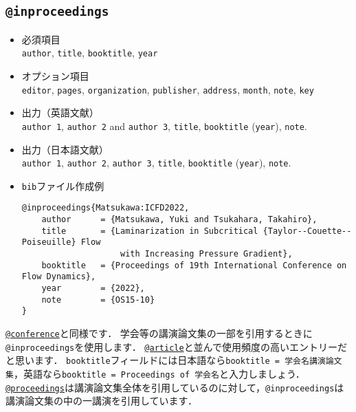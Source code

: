 \documentclass[a4paper,fleqn,uplatex,dvipdfmx]{jsarticle}
\begin{document}
\subsection{\texttt{@inproceedings}}
\label{ssec:inproceedings}
\begin{screen}
    \begin{itemize}
        \item 必須項目 \\
        \verb|author|, \verb|title|, \verb|booktitle|, \verb|year|
        \item オプション項目 \\
        \verb|editor|, \verb|pages|, \verb|organization|, \verb|publisher|, \verb|address|, \verb|month|, \verb|note|, \verb|key|
        \item 出力（英語文献） \\
            \colorbox[gray]{0.8}{\texttt{author 1}}, \colorbox[gray]{0.8}{\texttt{author 2}} and \colorbox[gray]{0.8}{\texttt{author 3}}, \colorbox[gray]{0.8}{\texttt{title}}, \colorbox[gray]{0.8}{\texttt{booktitle}} (\colorbox[gray]{0.8}{\texttt{year}}), \colorbox[gray]{0.8}{\texttt{note}}.
        \item 出力（日本語文献） \\
            \colorbox[gray]{0.8}{\texttt{author 1}}, \colorbox[gray]{0.8}{\texttt{author 2}}, \colorbox[gray]{0.8}{\texttt{author 3}}, \colorbox[gray]{0.8}{\texttt{title}}, \colorbox[gray]{0.8}{\texttt{booktitle}} (\colorbox[gray]{0.8}{\texttt{year}}), \colorbox[gray]{0.8}{\texttt{note}}.
        \item \verb|bib|ファイル作成例 \vspace{-3mm}
\begin{verbatim}
@inproceedings{Matsukawa:ICFD2022,
    author      = {Matsukawa, Yuki and Tsukahara, Takahiro},
    title       = {Laminarization in Subcritical {Taylor--Couette--Poiseuille} Flow 
                    with Increasing Pressure Gradient},
    booktitle   = {Proceedings of 19th International Conference on Flow Dynamics},
    year        = {2022},
    note        = {OS15-10}
}
\end{verbatim}
    \end{itemize}
\end{screen}

\hyperref[ssec:conference]{\texttt{@conference}}と同様です．
学会等の講演論文集の一部を引用するときに\verb|@inproceedings|を使用します．
\hyperref[ssec:article]{\texttt{@article}}と並んで使用頻度の高いエントリーだと思います．
\verb|booktitle|フィールドには日本語なら\texttt{booktitle = {\colorbox[gray]{0.8}{学会名}講演論文集}}，英語なら\texttt{booktitle = {Proceedings of \colorbox[gray]{0.8}{学会名}}}と入力しましょう．
\hyperref[ssec:proceedings]{\texttt{@proceedings}}は講演論文集全体を引用しているのに対して，\verb|@inproceedings|は講演論文集の中の一講演を引用しています．
\end{document}
